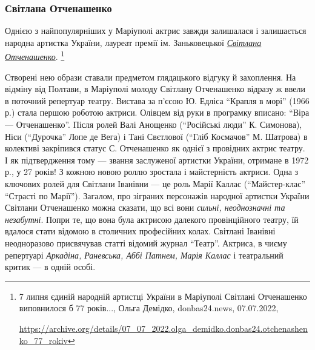 
\subsubsection{Світлана Отченашенко}

Однією з найпопулярніших у Маріуполі актрис завжди залишалася і залишається
народна артистка України, лауреат премії ім. Заньковецької \href{https://archive.org/details/07_07_2022.olga_demidko.donbas24.otchenashenko_77_rokiv}{\emph{Світлана Отченашенко}}.%
\footnote{7 липня єдиній народній артистці України в Маріуполі Світлані Отченашенко виповнилося б 77 років..., Ольга Демідко, donbas24.news, 07.07.2022, \par\url{https://archive.org/details/07_07_2022.olga_demidko.donbas24.otchenashenko_77_rokiv}}

Створені нею образи ставали предметом глядацького відгуку й
захоплення. На відміну від Полтави, в Маріуполі молоду Світлану Отченашенко
відразу ж ввели в поточний репертуар театру. Вистава за п'єсою Ю. Едліса
\enquote{Крапля в морі} (1966 р.) стала першою роботою актриси. Олівцем від руки в
програмку вписано: \enquote{Віра — Отченашенко}. Після ролей Валі Анощенко (\enquote{Російські
люди} К. Симонова), Ніси (\enquote{Дурочка} Лопе де Вега) і Тані Свєтлової (\enquote{Гліб
Космачов} М. Шатрова) в колективі закріпився статус С. Отченашенко як однієї з
провідних актрис театру. І як підтвердження тому — звання заслуженої артистки
України, отримане в 1972 р., у 27 років! З кожною новою роллю зростала і
майстерність актриси. Одна з ключових ролей для Світлани Іванівни — це роль
Марії Каллас (\enquote{Майстер-клас} \enquote{Страсті по Марії}). Загалом, про зіграних
персонажів народної артистки України Світлани Отченашенко можна сказати, що всі
вони \emph{сильні, неоднозначні та незабутні}. Попри те, що вона була актрисою
далекого провінційного театру, їй вдалося стати відомою в столичних професійних
колах. Світлані Іванівні неодноразово присвячував статті відомий журнал
\enquote{Театр}. Актриса, в чиєму репертуарі \emph{Аркадіна, Раневська, Аббі Патнем, Марія
Каллас} і театральний критик — в одній особі.


